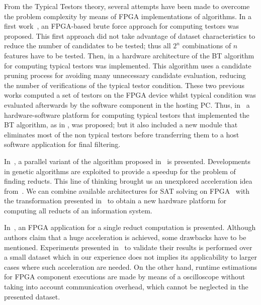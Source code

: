 \documentclass[authoryear,11pt]{elsarticle}
\begin{document}
  From the Typical Testors theory, several attempts have been made to overcome the problem 
  complexity by means of FPGA implementations of algorithms. In a first work~\citep{Cumplido06}, an 
  FPGA-based brute force approach for computing testors was proposed. This first approach did 
  not take advantage of dataset characteristics to reduce the number of candidates to be tested; 
  thus all $2^n$ combinations of $n$ features have to be tested. Then, in \citep{Rojas07} a hardware 
  architecture of the BT algorithm for computing typical testors was implemented. 
  This algorithm uses a candidate pruning process for avoiding many unnecessary candidate evaluation, 
  reducing the number of verifications of the typical testor condition. These two previous works computed 
  a set of testors on the FPGA device whilst typical condition was evaluated afterwards by the 
  software component in the hosting PC. Thus, in~\citep{Rojas12} a hardware-software platform for 
  computing typical testors that implemented the BT algorithm, as in \citep{Rojas07}, was proposed; but it also 
  included a new module that eliminates most of the non typical testors before transferring them to 
  a host software application for final filtering. 
	
  In~\citep{Wroblewski98}, a parallel variant of the algorithm proposed in~\citep{Wroblewski95} is presented.
  Developments in genetic algorithms are exploited to provide a speedup for the problem of finding reducts.
  This line of thinking brought us an unexplored acceleration idea from~\citep{Jensen14}. We can combine 
  available architectures for SAT solving on FPGA~\citep{Safar07,Kanazawa11} with the transformation
  presented in~\citep{Jensen14} to obtain a new hardware platform for computing all reducts of an information 
  system.
  
  In~\citep{Grzes13,Kopczynski14}, an FPGA application for a single reduct computation is presented. Although
  authors claim that a huge acceleration is achieved, some drawbacks have to be mentioned. Experiments presented 
  in~\citep{Kopczynski14} to validate their results is performed over a small dataset which in our experience 
  does not implies its applicability to larger cases where such acceleration are needed. On the other hand, 
  runtime estimations for FPGA component executions are made by means of a oscilloscope without taking into 
  account communication overhead, which cannot be neglected in the presented dataset.
\end{document}
